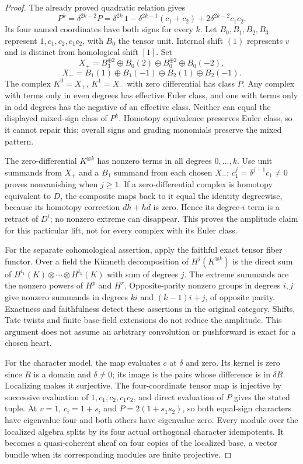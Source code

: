 \begin{proof}
The already proved quadratic relation gives
\[
 P^k=\delta^{2k-2}P
 =\delta^{2k}\,1-\delta^{2k-1}(c_1+c_2)
                  +2\delta^{2k-2}c_1c_2.
\]
Its four named coordinates have both signs for every $k$.
Let $B_0,B_1,B_2,B_3$ represent $1,c_1,c_2,c_1c_2$, with $B_0$ the
tensor unit. Internal shift $(1)$ represents $v$ and is distinct
from homological shift $[1]$. Set
\[
 X_+=B_3^{\oplus2}\oplus B_0(2)\oplus B_0^{\oplus2}\oplus B_0(-2),
\]
\[
 X_-=B_1(1)\oplus B_1(-1)\oplus B_2(1)\oplus B_2(-1).
\]
The complex $K^0=X_+$, $K^1=X_-$ with zero differential has class
$P$. Any complex with terms only in even degrees has effective Euler
class, and one with terms only in odd degrees has the negative of an
effective class. Neither can equal the displayed mixed-sign class of
$P^k$. Homotopy equivalence preserves Euler class, so it cannot repair
this; overall signs and grading monomials preserve the mixed pattern.

The zero-differential $K^{\otimes k}$ has nonzero terms in all degrees
$0,\ldots,k$. Use unit summands from $X_+$ and a $B_1$ summand from
each chosen $X_-$; $c_1^j=\delta^{j-1}c_1\ne0$ proves nonvanishing
when $j\ge1$. If a zero-differential complex is homotopy equivalent
to $D$, the composite maps back to it equal the identity degreewise,
because its homotopy correction $dh+hd$ is zero. Hence its degree-$i$
term is a retract of $D^i$; no nonzero extreme can disappear. This
proves the amplitude claim for this particular lift, not for every
complex with its Euler class.

For the separate cohomological assertion, apply the faithful exact
tensor fiber functor. Over a field the K\"unneth decomposition of
$H^j(K^{\otimes k})$ is the direct sum of
$H^{i_1}(K)\otimes\cdots\otimes H^{i_k}(K)$ with sum of degrees $j$.
The extreme summands are the nonzero powers of $H^p$ and $H^r$.
Opposite-parity nonzero groups in degrees $i,j$ give nonzero summands
in degrees $ki$ and $(k-1)i+j$, of opposite parity. Exactness and
faithfulness detect these assertions in the original category.
Shifts, Tate twists and finite base-field extensions do not reduce
the amplitude. This argument does not assume an arbitrary convolution
or pushforward is exact for a chosen heart.

For the character model, the map evaluates $c$ at $\delta$ and zero.
Its kernel is zero since $R$ is a domain and $\delta\ne0$; its image
is the pairs whose difference is in $\delta R$. Localizing makes it
surjective. The four-coordinate tensor map is injective by successive
evaluation of $1,c_1,c_2,c_1c_2$, and direct evaluation of $P$ gives
the stated tuple. At $v=1$, $c_i=1+s_i$ and $P=2(1+s_1s_2)$,
so both equal-sign characters have eigenvalue four and both others
have eigenvalue zero. Every module over the localized algebra splits
by its four actual orthogonal character idempotents. It becomes a
quasi-coherent sheaf on four copies of the localized base, a vector
bundle when its corresponding modules are finite projective.


\end{proof}
